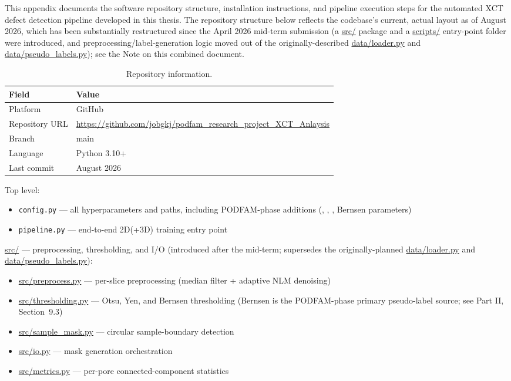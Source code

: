 
This appendix documents the software repository structure, installation instructions, and pipeline
execution steps for the automated XCT defect detection pipeline developed in this thesis. The
repository structure below reflects the codebase's current, actual layout as of August 2026, which
has been substantially restructured since the April 2026 mid-term submission (a \url{src/}
package and a \url{scripts/} entry-point folder were introduced, and preprocessing/label-generation
logic moved out of the originally-described \url{data/loader.py} and
\url{data/pseudo_labels.py}); see the Note on this combined document.

\begin{table}[htbp]
\centering
\caption{Repository information.}
\begin{tabular}{lp{10cm}}
\toprule
\textbf{Field} & \textbf{Value} \\
\midrule
Platform & GitHub \\
Repository URL & \url{https://github.com/jobgkj/podfam_research_project_XCT_Anlaysis} \\
Branch & main \\
Language & Python 3.10+ \\
Last commit & August 2026 \\
\bottomrule
\end{tabular}
\end{table}

Top level:
\begin{itemize}
\item \texttt{config.py} --- all hyperparameters and paths, including PODFAM-phase additions
  (, , ,
  Bernsen parameters)
\item \texttt{pipeline.py} --- end-to-end 2D(+3D) training entry point
\end{itemize}

\url{src/} --- preprocessing, thresholding, and I/O (introduced after the mid-term; supersedes
the originally-planned \url{data/loader.py} and \url{data/pseudo_labels.py}):
\begin{itemize}
\item \url{src/preprocess.py} --- per-slice preprocessing (median filter + adaptive NLM
  denoising)
\item \url{src/thresholding.py} --- Otsu, Yen, and Bernsen thresholding (Bernsen is the
  PODFAM-phase primary pseudo-label source; see Part II, Section~9.3)
\item \url{src/sample_mask.py} --- circular sample-boundary detection
\item \url{src/io.py} --- mask generation orchestration
\item \url{src/metrics.py} --- per-pore connected-component statistics
\end{itemize}

